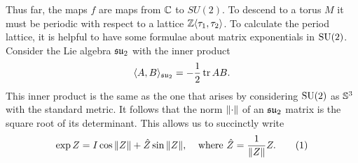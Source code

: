 \documentclass{article}
\begin{document}



Thus far, the maps $f$ are maps from $\C$ to $SU(2)$. To descend to a torus $M$ it must be periodic with respect to a lattice $\Z\langle \tau_1,\tau_2\rangle$. To calculate the period lattice, it is helpful to have some formulae about matrix exponentials in $\SU(2)$. Consider the Lie algebra $\su_2$ with the inner product
\[
\langle A, B \rangle_{\su_2} = -\frac{1}{2}\tr AB.
\]
This inner product is the same as the one that arises by considering $\SU(2)$ as $\S^3$ with the standard metric. It follows that the norm $\norm{\cdot}$ of an $\su_2$ matrix is the square root of its determinant. This allows us to succinctly write 
\[
    \exp Z = I \cos \norm{Z} + \hat{Z} \sin \norm{Z},
    \;\;\;\;
    \text{where }\hat{Z} = \frac{1}{\norm{Z}} Z.
\labelthis{eqn:exp formula}
\]
\end{document}
